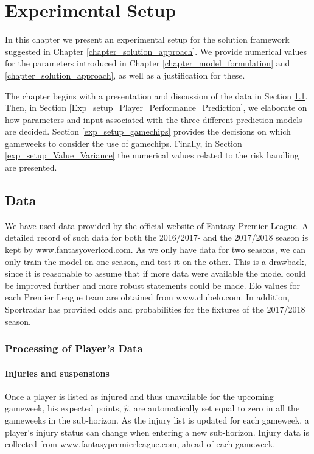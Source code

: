\chapter{Experimental Setup}\label{chapter_experimental_setup}

In this chapter we present an experimental setup for the solution framework suggested in Chapter \ref{chapter_solution_approach}. We provide numerical values for the parameters introduced in Chapter \ref{chapter_model_formulation} and \ref{chapter_solution_approach}, as well as a justification for these. 

\newpar

The chapter begins with a presentation and discussion of the data in Section \ref{exp_setup_data}. Then, in Section \ref{Exp_setup_Player_Performance_Prediction}, we elaborate on how parameters and input associated with the three different prediction models are decided. Section \ref{exp_setup_gamechips} provides the decisions on which gameweeks to consider the use of gamechips. Finally, in Section \ref{exp_setup_Value_Variance} the numerical values related to the risk handling are presented.

\section{Data} \label{exp_setup_data}
We have used data provided by the official website of Fantasy Premier League. A detailed record of such data for both the 2016/2017- and the 2017/2018 season is kept by www.fantasyoverlord.com. As we only have data for two seasons, we can only train the model on one season, and test it on the other. This is a drawback, since it is reasonable to assume that if more data were available the model could be improved further and more robust statements could be made. Elo values for each Premier League team are obtained from www.clubelo.com. In addition, Sportradar has provided odds and probabilities for the fixtures of the 2017/2018 season. 

\subsection{Processing of Player's Data}

\subsubsection{Injuries and suspensions}
Once a player is listed as injured and thus unavailable for the upcoming gameweek, his expected points, $\hat{p}$, are automatically set equal to zero in all the gameweeks in the sub-horizon. As the injury list is updated for each gameweek, a player's injury status can change when entering a new sub-horizon. Injury data is collected from www.fantasypremierleague.com, ahead of each gameweek. 

